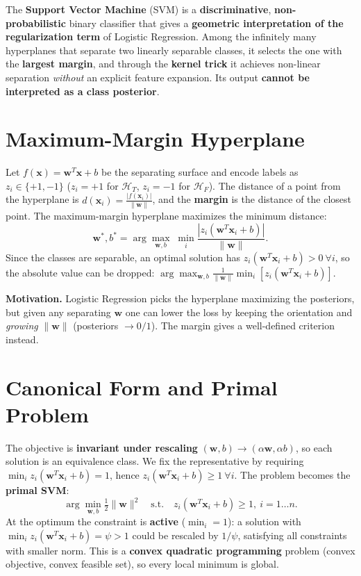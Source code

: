 The \textbf{Support Vector Machine} (SVM) is a \textbf{discriminative}, \textbf{non-probabilistic} binary classifier that gives a \textbf{geometric interpretation of the regularization term} of Logistic Regression. Among the infinitely many hyperplanes that separate two linearly separable classes, it selects the one with the \textbf{largest margin}, and through the \textbf{kernel trick} it achieves non-linear separation \emph{without} an explicit feature expansion. Its output \textbf{cannot be interpreted as a class posterior}.

\section*{Maximum-Margin Hyperplane}

Let $f(\mathbf{x})=\mathbf{w}^T\mathbf{x}+b$ be the separating surface and encode labels as $z_i\in\{+1,-1\}$ ($z_i=+1$ for $\mathcal{H}_T$, $z_i=-1$ for $\mathcal{H}_F$). The distance of a point from the hyperplane is $d(\mathbf{x}_i)=\frac{|f(\mathbf{x}_i)|}{\|\mathbf{w}\|}$, and the \textbf{margin} is the distance of the closest point. The maximum-margin hyperplane maximizes the minimum distance:
\[
\mathbf{w}^*,b^*=\arg\max_{\mathbf{w},b}\;\min_i\frac{|z_i(\mathbf{w}^T\mathbf{x}_i+b)|}{\|\mathbf{w}\|}.
\]
Since the classes are separable, an optimal solution has $z_i(\mathbf{w}^T\mathbf{x}_i+b)>0\ \forall i$, so the absolute value can be dropped: $\arg\max_{\mathbf{w},b}\frac{1}{\|\mathbf{w}\|}\min_i[z_i(\mathbf{w}^T\mathbf{x}_i+b)]$.

\textbf{Motivation.} Logistic Regression picks the hyperplane maximizing the posteriors, but given any separating $\mathbf{w}$ one can lower the loss by keeping the orientation and \emph{growing} $\|\mathbf{w}\|$ (posteriors $\to0/1$). The margin gives a well-defined criterion instead.

\section*{Canonical Form and Primal Problem}

The objective is \textbf{invariant under rescaling} $(\mathbf{w},b)\to(\alpha\mathbf{w},\alpha b)$, so each solution is an equivalence class. We fix the representative by requiring $\min_i z_i(\mathbf{w}^T\mathbf{x}_i+b)=1$, hence $z_i(\mathbf{w}^T\mathbf{x}_i+b)\ge1\ \forall i$. The problem becomes the \textbf{primal SVM}:
\[
\arg\min_{\mathbf{w},b}\tfrac12\|\mathbf{w}\|^2\quad\text{s.t.}\quad z_i(\mathbf{w}^T\mathbf{x}_i+b)\ge1,\ i=1\ldots n .
\]
At the optimum the constraint is \textbf{active} ($\min_i=1$): a solution with $\min_i z_i(\mathbf{w}^T\mathbf{x}_i+b)=\psi>1$ could be rescaled by $1/\psi$, satisfying all constraints with smaller norm. This is a \textbf{convex quadratic programming} problem (convex objective, convex feasible set), so every local minimum is global.

